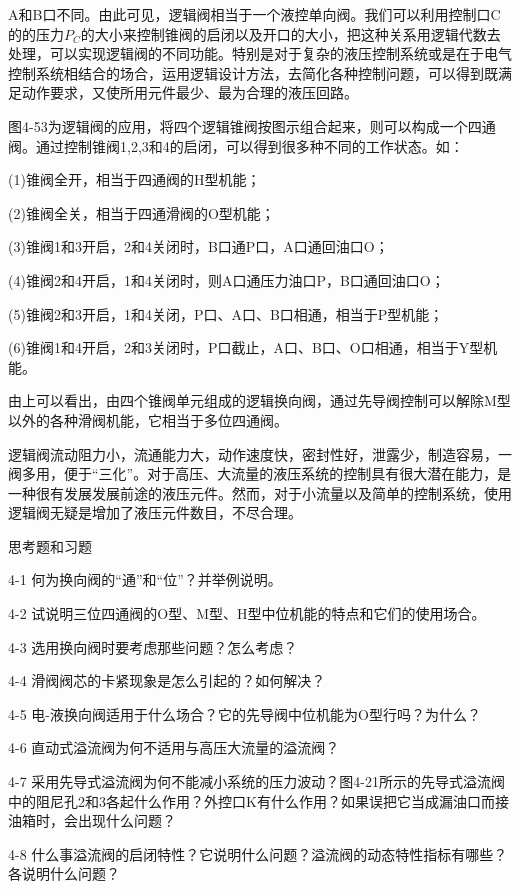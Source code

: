 
	A和B口不同。由此可见，逻辑阀相当于一个液控单向阀。我们可以利用控制口C的的压力$P_{C}$的大小来控制锥阀的启闭以及开口的大小，把这种关系用逻辑代数去处理，可以实现逻辑阀的不同功能。特别是对于复杂的液压控制系统或是在于电气控制系统相结合的场合，运用逻辑设计方法，去简化各种控制问题，可以得到既满足动作要求，又使所用元件最少、最为合理的液压回路。
	
	图4-53为逻辑阀的应用，将四个逻辑锥阀按图示组合起来，则可以构成一个四通阀。通过控制锥阀1,2,3和4的启闭，可以得到很多种不同的工作状态。如：
	
	(1)锥阀全开，相当于四通阀的H型机能；
	
	(2)锥阀全关，相当于四通滑阀的O型机能；
	
	(3)锥阀1和3开启，2和4关闭时，B口通P口，A口通回油口O；
	
	(4)锥阀2和4开启，1和4关闭时，则A口通压力油口P，B口通回油口O；
	
	(5)锥阀2和3开启，1和4关闭，P口、A口、B口相通，相当于P型机能；
	
	(6)锥阀1和4开启，2和3关闭时，P口截止，A口、B口、O口相通，相当于Y型机能。
	
	由上可以看出，由四个锥阀单元组成的逻辑换向阀，通过先导阀控制可以解除M型以外的各种滑阀机能，它相当于多位四通阀。
	
	逻辑阀流动阻力小，流通能力大，动作速度快，密封性好，泄露少，制造容易，一阀多用，便于“三化”。对于高压、大流量的液压系统的控制具有很大潜在能力，是一种很有发展发展前途的液压元件。然而，对于小流量以及简单的控制系统，使用逻辑阀无疑是增加了液压元件数目，不尽合理。
	
	\begin{center}
		思考题和习题
	\end{center}
	
	4-1 何为换向阀的“通”和“位”？并举例说明。
	
	4-2 试说明三位四通阀的O型、M型、H型中位机能的特点和它们的使用场合。
	
	4-3	选用换向阀时要考虑那些问题？怎么考虑？
	
	4-4 滑阀阀芯的卡紧现象是怎么引起的？如何解决？
	
	4-5 电-液换向阀适用于什么场合？它的先导阀中位机能为O型行吗？为什么？
	
	4-6 直动式溢流阀为何不适用与高压大流量的溢流阀？
	
	4-7 采用先导式溢流阀为何不能减小系统的压力波动？图4-21所示的先导式溢流阀中的阻尼孔2和3各起什么作用？外控口K有什么作用？如果误把它当成漏油口而接油箱时，会出现什么问题？
	
	4-8 什么事溢流阀的启闭特性？它说明什么问题？溢流阀的动态特性指标有哪些？各说明什么问题？
	

